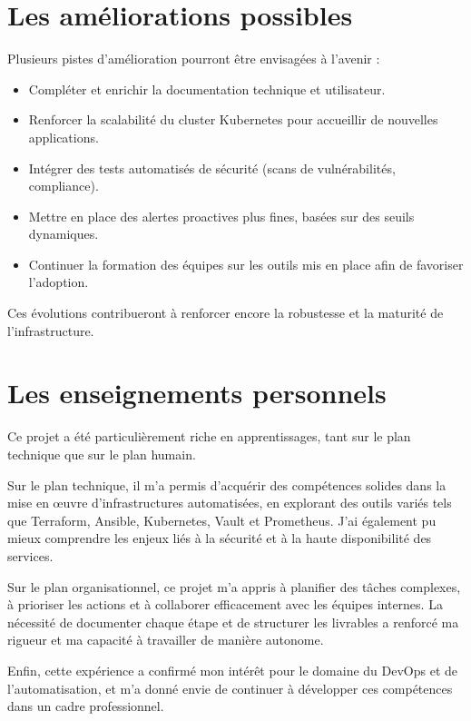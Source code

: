 \section{Les améliorations possibles}

Plusieurs pistes d’amélioration pourront être envisagées à l’avenir :

\begin{itemize}
    \item Compléter et enrichir la documentation technique et utilisateur.
    \item Renforcer la scalabilité du cluster Kubernetes pour accueillir de nouvelles applications.
    \item Intégrer des tests automatisés de sécurité (scans de vulnérabilités, compliance).
    \item Mettre en place des alertes proactives plus fines, basées sur des seuils dynamiques.
    \item Continuer la formation des équipes sur les outils mis en place afin de favoriser l’adoption.
\end{itemize}

Ces évolutions contribueront à renforcer encore la robustesse et la maturité de l’infrastructure.

\section{Les enseignements personnels}

Ce projet a été particulièrement riche en apprentissages, tant sur le plan technique que sur le plan humain.

Sur le plan technique, il m’a permis d’acquérir des compétences solides dans la mise en œuvre d’infrastructures automatisées, en explorant des outils variés tels que Terraform, Ansible, Kubernetes, Vault et Prometheus. J’ai également pu mieux comprendre les enjeux liés à la sécurité et à la haute disponibilité des services.

Sur le plan organisationnel, ce projet m’a appris à planifier des tâches complexes, à prioriser les actions et à collaborer efficacement avec les équipes internes. La nécessité de documenter chaque étape et de structurer les livrables a renforcé ma rigueur et ma capacité à travailler de manière autonome.

Enfin, cette expérience a confirmé mon intérêt pour le domaine du DevOps et de l’automatisation, et m’a donné envie de continuer à développer ces compétences dans un cadre professionnel.

